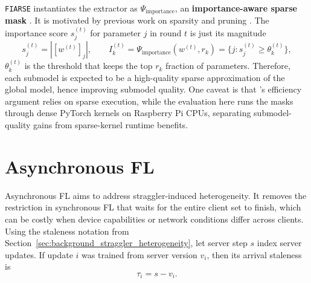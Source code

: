 \texttt{FIARSE} instantiates the extractor as \(\Psi_{\mathrm{importance}}\), an \textbf{importance-aware sparse mask} \parencite{wu2024fiarse}. It is motivated by previous work on sparsity and pruning \parencite{hoefler2021sparsity}. The importance score \(s_j^{(t)}\) for parameter \(j\) in round \(t\) is just its magnitude
\[
    s_j^{(t)}=|[w^{(t)}]_j|,
    \qquad
    I_k^{(t)}
    =
    \Psi_{\mathrm{importance}}\!\left(w^{(t)}, r_k\right)
    =
    \{j:s_j^{(t)}\geq\theta_k^{(t)}\},
\]
\(\theta_k^{(t)}\) is the threshold that keeps the top \(r_k\) fraction of parameters. Therefore, each submodel is expected to be a high-quality sparse approximation of the global model, hence improving submodel quality. One caveat is that \cite{wu2024fiarse}'s efficiency argument relies on sparse execution, while the evaluation here runs the masks through dense PyTorch kernels on Raspberry Pi CPUs, separating submodel-quality gains from sparse-kernel runtime benefits.


\section{Asynchronous FL}
\label{sec:related_async_fl}

Asynchronous FL aims to address straggler-induced heterogeneity. It removes the restriction in synchronous FL that waits for the entire client set to finish, which can be costly when device capabilities or network conditions differ across clients. Using the staleness notation from Section~\ref{sec:background_straggler_heterogeneity}, let server step \(s\) index server updates. If update \(i\) was trained from server version \(v_i\), then its arrival staleness is
\[
    \tau_i = s - v_i.
\]

